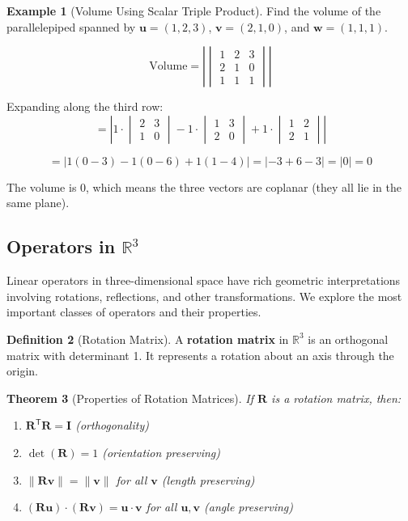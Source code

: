 \documentclass[12pt]{article}
\numberwithin{equation}{section}
\newcommand{\vect}[1]{\boldsymbol{#1}}   %
\newcommand{\mat}[1]{\mathbf{#1}}        %
\newcommand{\trans}{\mathsf{T}}          %
\theoremstyle{plain}
\newtheorem{theorem}{Theorem}[section]
\theoremstyle{definition}
\newtheorem{definition}[theorem]{Definition}
\newtheorem{example}[theorem]{Example}
\theoremstyle{remark}
\begin{document}
\begin{example}[Volume Using Scalar Triple Product]
Find the volume of the parallelepiped spanned by $\vect{u} = (1, 2, 3)$, $\vect{v} = (2, 1, 0)$, and $\vect{w} = (1, 1, 1)$.

$$\text{Volume} = \left|\begin{vmatrix} 1 & 2 & 3 \\ 2 & 1 & 0 \\ 1 & 1 & 1 \end{vmatrix}\right|$$

Expanding along the third row:
$$= \left|1 \cdot \begin{vmatrix} 2 & 3 \\ 1 & 0 \end{vmatrix} - 1 \cdot \begin{vmatrix} 1 & 3 \\ 2 & 0 \end{vmatrix} + 1 \cdot \begin{vmatrix} 1 & 2 \\ 2 & 1 \end{vmatrix}\right|$$

$$= |1(0 - 3) - 1(0 - 6) + 1(1 - 4)| = |-3 + 6 - 3| = |0| = 0$$

The volume is 0, which means the three vectors are coplanar (they all lie in the same plane).
\end{example}

\subsection{Operators in $\mathbb{R}^3$}

Linear operators in three-dimensional space have rich geometric interpretations involving rotations, reflections, and other transformations. We explore the most important classes of operators and their properties.

\begin{definition}[Rotation Matrix]
A \textbf{rotation matrix} in $\mathbb{R}^3$ is an orthogonal matrix with determinant 1. It represents a rotation about an axis through the origin.
\end{definition}

\begin{theorem}[Properties of Rotation Matrices]
If $\mat{R}$ is a rotation matrix, then:
\begin{enumerate}
\item $\mat{R}^{\trans}\mat{R} = \mat{I}$ (orthogonality)
\item $\det(\mat{R}) = 1$ (orientation preserving)
\item $\|\mat{R}\vect{v}\| = \|\vect{v}\|$ for all $\vect{v}$ (length preserving)
\item $(\mat{R}\vect{u}) \cdot (\mat{R}\vect{v}) = \vect{u} \cdot \vect{v}$ for all $\vect{u}, \vect{v}$ (angle preserving)
\end{enumerate}
\end{theorem}
\end{document}
